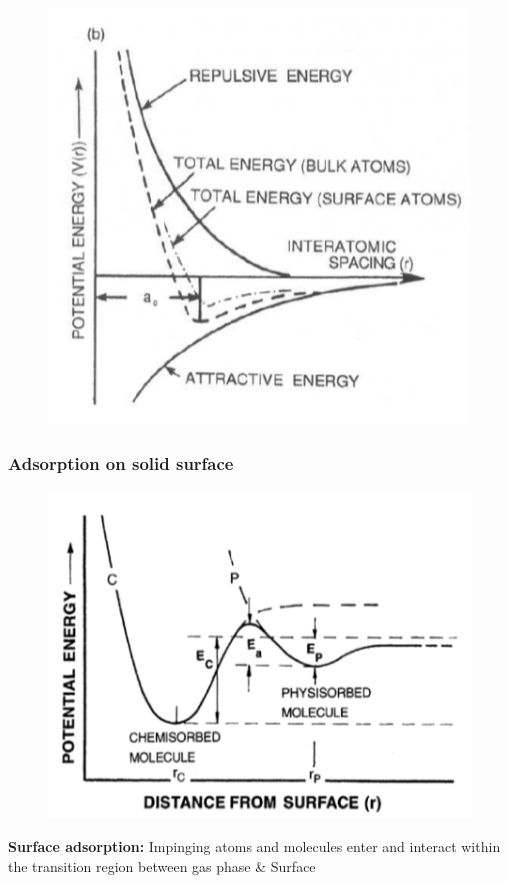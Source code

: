 \begin{figure}[h]
    \centering
    \includegraphics[width=\columnwidth]{images/atombond.png}
    \label{fig:atombond}
\end{figure}
\subsubsection{Adsorption on solid surface}
\begin{figure}[h]
    \centering
    \includegraphics[width=\columnwidth]{images/surfacedistance.png}
    \label{fig:surfdist}
\end{figure}
\textbf{Surface adsorption: }Impinging atoms and molecules enter and interact within the transition region between gas phase \& Surface


